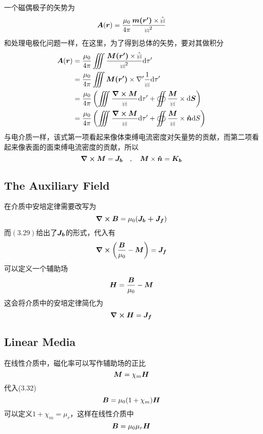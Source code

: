 \documentclass[14pt,oneside]{book}
\def\rr{{\mbox{$\resizebox{.09in}{.08in}{\texttt{[image: ScriptR]}}$}}}
\def\br{{\mbox{$\resizebox{.09in}{.08in}{\texttt{[image: BoldR]}}$}}}
\newcommand{\hr}{\hat{\br}}
\begin{document}
\begin{large}
一个磁偶极子的矢势为
\begin{equation}
  \vb*{A}(\vb*{r})=\frac{\mu_0}{4\pi}\frac{\vb*{m(r')}\times\hr}{\rr^2}
\end{equation}
和处理电极化问题一样，在这里，为了得到总体的矢势，要对其做积分
\begin{equation}
\begin{aligned}
	   \vb*{A}(\vb*{r})&=\frac{\mu_0}{4\pi}\iiint \frac{\vb*{M(r')}\times\hr}{\rr^2}\dd \tau'\\
	   &=\frac{\mu_0}{4\pi}\iiint \vb*{M(r')}\times\nabla'\frac{1}{\rr}\dd \tau'\\
	   &=\frac{\mu_0}{4\pi}\left( \iiint \frac{\curl{\vb*{M}}}{\rr}\dd \tau' +\oiint \frac{\vb*{M}}{\rr}\times \dd \vb*{S} \right)\\
	   &=\frac{\mu_0}{4\pi}\left( \iiint \frac{\curl{\vb*{M}}}{\rr}\dd \tau' +\oiint \frac{\vb*{M}}{\rr}\times \vb*{\hat{n}}\dd S \right)
\end{aligned}
\end{equation}
与电介质一样，该式第一项看起来像体束缚电流密度对矢量势的贡献，而第二项看起来像表面的面束缚电流密度的贡献，所以
\begin{equation}
  \curl{\vb*{M}}=\vb*{J_b}\quad,\quad \vb*{M}\times \vb*{\hat n}=\vb*{K_b}
\end{equation}
\subsection{The Auxiliary Field}
在介质中安培定律需要改写为
\begin{equation}
  \curl{\vb*{B}}=\mu_0(\vb*{J_b+J_f})
\end{equation}
而$(3.29)$给出了$\vb*{J_b}$的形式，代入有
\begin{equation}
  \curl{\left(\frac{\vb*{B}}{\mu_0}-\vb*{M}\right)}=\vb*{J_f}
\end{equation}
可以定义一个辅助场
\begin{equation}
  \vb*{H}=\frac{\vb*{B}}{\mu_0}-\vb*{M}
\end{equation}
这会将介质中的安培定律简化为
\begin{equation}
  \curl{\vb*{H}}=\vb*{J_f}
\end{equation}
\subsection{Linear Media}
在线性介质中，磁化率可以写作辅助场的正比
\begin{equation}
  \vb*{M}=\chi_m \vb*{H}
\end{equation}
代入(3.32)
\begin{equation}
  \vb*{B}=\mu_0(1+\chi_m)\vb*{H}
\end{equation}
可以定义$1+\chi_m=\mu_r$，这样在线性介质中
\begin{equation}
  \vb*{B}=\mu_0\mu_r \vb*{H}
\end{equation}

\end{large}
\end{document}
